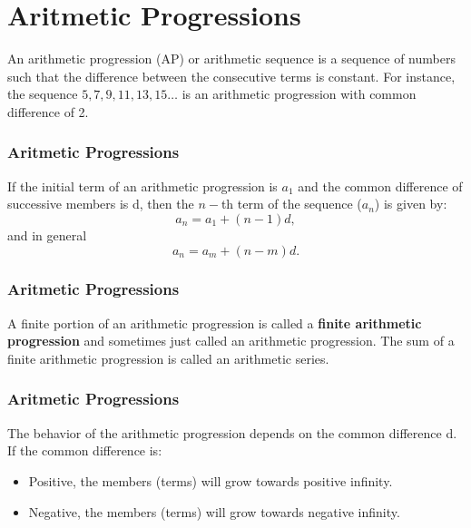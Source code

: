 \documentclass{beamer}
\begin{document}
\section{Aritmetic Progressions}
\begin{frame}
An arithmetic progression (AP) or arithmetic sequence is a sequence of numbers such that the difference between the consecutive terms is constant. For instance, the sequence $5, 7, 9, 11, 13, 15 \ldots$ is an arithmetic progression with common difference of 2.
\end{frame}

\begin{frame}
\frametitle{Aritmetic Progressions}



If the initial term of an arithmetic progression is $a_{1}$ and the common difference of successive members is d, then the $n-$th term of the sequence ($a_{n}$) is given by:
\[ a_{n}=a_{1}+(n-1)d, \] 
and in general
\[ a_{n}=a_{m}+(n-m)d.\]

\end{frame}

\begin{frame}
	\frametitle{Aritmetic Progressions}
A finite portion of an arithmetic progression is called a \textbf{finite arithmetic progression} and sometimes just called an arithmetic progression. The sum of a finite arithmetic progression is called an arithmetic series.
\newline
\end{frame}

\begin{frame}
	\frametitle{Aritmetic Progressions}
The behavior of the arithmetic progression depends on the common difference d. If the common difference is:
\begin{itemize}
\item Positive, the members (terms) will grow towards positive infinity.
\item Negative, the members (terms) will grow towards negative infinity.
\end{itemize}

\end{frame}
\end{document}
